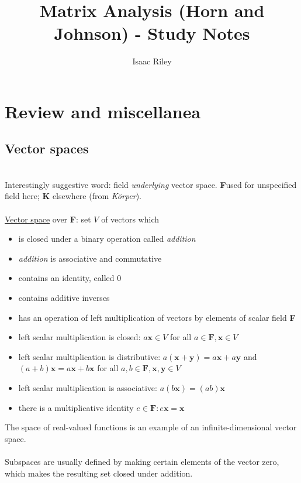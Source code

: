 \documentclass[a4paper]{article}
\title{Matrix Analysis (Horn and Johnson) - Study Notes}
\author{Isaac Riley}
\newcommand{\todobox}{\textcolor{red}{\fbox{\phantom{--}}}}
\newcommand{\x}{\textbf{x}}
\newcommand{\y}{\textbf{y}}
\newcommand{\F}{\textbf{F}}
\begin{document}
\maketitle
\tableofcontents
\newpage


\setcounter{section}{-1}
\newpage
\section{Review and miscellanea}
\setcounter{subsection}{-1}
\subsection{Vector spaces}
\todobox \\
Interestingly suggestive word: field \textit{underlying} vector space. \F used for unspecified field here; \textbf{K} elsewhere (from \textit{Körper}).\\~\\
\underline{Vector space} over \F: set $V$ of vectors which
\begin{itemize}
 \item is closed under a binary operation called \textit{addition}
 \item \textit{addition} is associative and commutative
 \item contains an identity, called $0$
 \item contains additive inverses
 \item has an operation of left multiplication of vectors by elements of scalar field \F
 \item left scalar multiplication is closed: $a\x \in V$ for all $a \in \F, \x \in V$
 \item left scalar multiplication is distributive: $a(\x+\y) = a\x+a\y$ and $(a+b)\x = a\x+b\x$ for all $a,b \in \F, \x,\y \in V$
 \item left scalar multiplication is associative: $a(b\x)=(ab)\x$
 \item there is a multiplicative identity $e \in \F: e\x = \x$
\end{itemize}
The space of real-valued functions is an example of an infinite-dimensional vector space.\\~\\
Subspaces are usually defined by making certain elements of the vector zero, which makes the resulting set closed under addition.\\~\\
\end{document}
